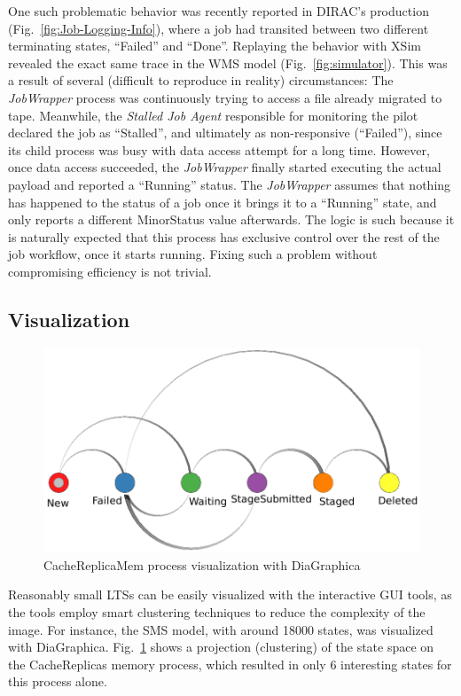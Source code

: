 \documentclass[sort&compress,preprint,3p]{elsarticle}
\begin{document}
One such problematic behavior was recently reported in DIRAC's production (Fig.~\ref{fig:Job-Logging-Info}), where
a job had transited between two different terminating states, ``Failed'' and ``Done''.
Replaying the behavior with XSim revealed the exact same trace in the WMS model (Fig.~\ref{fig:simulator}).
This was a result of several (difficult to reproduce in reality) circumstances:
The \textit{JobWrapper} process was continuously trying to access a file already 
migrated to tape. Meanwhile, the \textit{Stalled Job Agent} responsible for 
monitoring the pilot declared the job as ``Stalled'', and ultimately as non-responsive (``Failed''),
since its child process was busy with data access attempt for a long time.
However, once data access succeeded, the \textit{JobWrapper} finally started executing the 
actual payload and reported a ``Running'' status. 
The \textit{JobWrapper} assumes that nothing has happened to the status of a job once 
it brings it to a ``Running'' state, 
and only reports a different MinorStatus value afterwards.
The logic is such
because it is naturally expected that this process has exclusive control 
over the rest of the job workflow, once it starts running. Fixing such
a problem without compromising efficiency is not trivial.
\subsection{Visualization}
\begin{figure}[tp]
\vspace{-10 pt}
\includegraphics[width=0.5\linewidth,keepaspectratio=true]{./graphics/Figure7_new.png}
\centering
\caption{CacheReplicaMem process visualization with DiaGraphica}
\label{fig:DiaGraphica}
\end{figure}%
Reasonably small LTSs can be easily visualized with the interactive GUI tools,
as the tools employ smart clustering techniques to reduce the complexity of the image.
For instance, the SMS model, with around 18000 states,
was visualized with DiaGraphica. Fig.~\ref{fig:DiaGraphica} shows a projection (clustering) of the state space
on the CacheReplicas memory process, which resulted in only 6 interesting states for this process alone.
\end{document}
